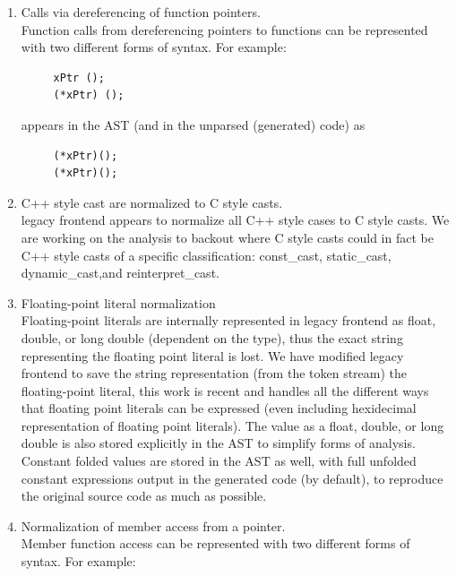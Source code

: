 \begin{enumerate}
     \item Calls via dereferencing of function pointers. \\
     Function calls from dereferencing pointers to functions can be represented with two 
     different forms of syntax. For example:
{\indent
{\mySmallFontSize

\begin{verbatim}
     xPtr ();
     (*xPtr) ();
\end{verbatim}
}}
     appears in the AST (and in the unparsed (generated) code) as
{\indent
{\mySmallFontSize

\begin{verbatim}
     (*xPtr)();
     (*xPtr)();
\end{verbatim}
}}

     \item C++ style cast are normalized to C style casts. \\
     legacy frontend appears to normalize all C++ style cases to C style casts. We are
     working on the analysis to backout where C style casts could in fact
     be C++ style casts of a specific classification: const\_cast, static\_cast,
     dynamic\_cast,and reinterpret\_cast.

     \item Floating-point literal normalization \\
     Floating-point literals are internally represented in legacy frontend as float, double, or long
     double (dependent on the type), thus the exact string representing the floating point
     literal is lost.  We have modified legacy frontend to save the string representation (from the
     token stream) the floating-point literal, this work is recent and handles all the
     different ways that floating point literals can be expressed (even including
     hexidecimal representation of floating point literals).  The value as a float, double,
     or long double is also stored explicitly in the AST to simplify forms of analysis.
     Constant folded values are stored in the AST as well, with full unfolded constant 
     expressions output in the generated code (by default), to reproduce the original 
     source code as much as possible.

     \item Normalization of member access from a pointer. \\
     Member function access can be represented with two different forms of syntax. For example:
{\indent
{\mySmallFontSize

}}
\end{enumerate}
